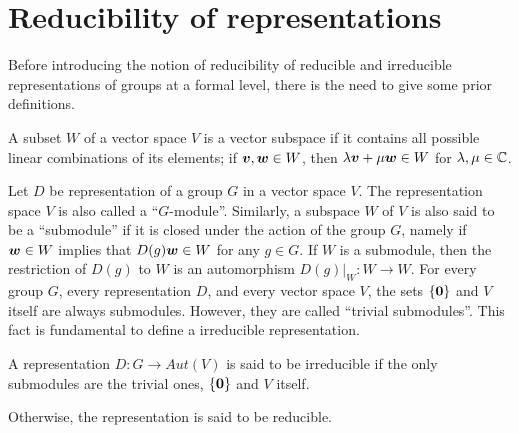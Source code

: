 \section{Reducibility of representations}
Before introducing the notion of reducibility of reducible and irreducible representations of groups at a formal level, there is the need to give some prior definitions.
\begin{defn}
    A subset $W$ of a vector space $V$ is a vector subspace if it contains all possible linear combinations of its elements; if $\bm{v},\bm{w} \in W$, then $\lambda\bm{v} + \mu\bm{w} \in W$ for $\lambda,\mu \in \mathbb{C}$. 
\end{defn}
Let $D$ be representation of a group $G$ in a vector space $V$. The representation space $V$ is also called a ``$G$-module''. Similarly, a subspace $W$ of $V$ is also said to be a ``submodule'' if it is closed under the action of the group $G$, namely if $\bm{w} \in W$ implies that $D(g)\bm{w} \in W$ for any $g \in G$. If $W$ is a submodule, then the restriction of $D(g)$ to $W$ is an automorphism $D(g)|_W : W \to W$. For every group $G$, every representation $D$, and every vector space $V$, the sets $\{\bm{0}\}$ and $V$ itself are always submodules. However, they are called ``trivial submodules''. This fact is fundamental to define a irreducible representation.
\begin{defn}
    A representation $D : G \to Aut(V)$ is said to be irreducible if the only submodules are the trivial ones, $\{\bm{0}\}$ and $V$ itself. 
\end{defn}
Otherwise, the representation is said to be reducible. 

